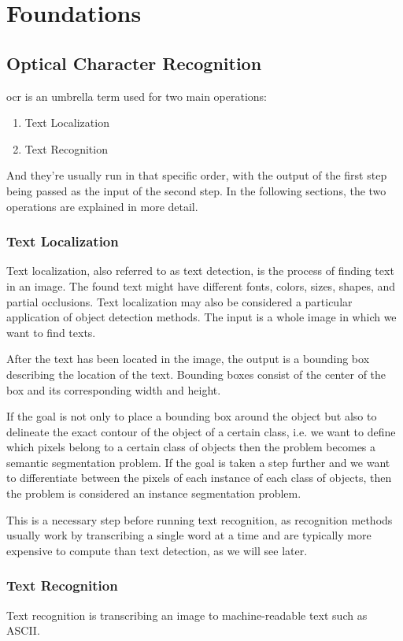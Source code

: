 \chapter{Foundations}

\section{Optical Character Recognition}
\gls{ocr} is an umbrella term used for two main operations:
\begin{enumerate}
    \item Text Localization
    \item Text Recognition
\end{enumerate}
And they're usually run in that specific order, with the output of the first step being passed as the input of the second step. In the following sections, the two operations are explained in more detail.
\subsection{Text Localization}
Text localization, also referred to as text detection, is the process of finding text in an image. The found text might have different fonts, colors, sizes, shapes, and partial occlusions. Text localization may also be considered a particular application of object detection methods.
The input is a whole image in which we want to find texts.

After the text has been located in the image, the output is a bounding box describing the location of the text. Bounding boxes consist of the center of the box and its corresponding width and height.

If the goal is not only to place a bounding box around the object but also to delineate the exact contour of the object of a certain class, i.e. we want to define which pixels belong to a certain class of objects then the problem becomes a semantic segmentation problem. If the goal is taken a step further and we want to differentiate between the pixels of each instance of each class of objects, then the problem is considered an instance segmentation problem.

This is a necessary step before running text recognition, as recognition methods usually work by transcribing a single word at a time and are typically more expensive to compute than text detection, as we will see later.
\subsection{Text Recognition}
Text recognition is transcribing an image to machine-readable text such as ASCII.

